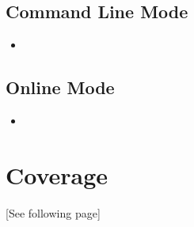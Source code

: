 \documentclass[a4paper, 12pt]{article}
\begin{document}
    \subsection{Command Line Mode}
    \setcounter{aReqNum}{2000}
    \begin{itemize}
        \item
    \end{itemize}

    \subsection{Online Mode}
    \setcounter{aReqNum}{3000}
    \begin{itemize}
        \item
    \end{itemize}

    \section{Coverage} \label{coverage}
    [See following page]
    
\end{document}
